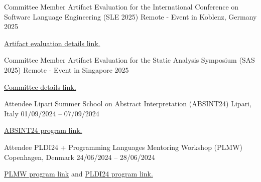 
\begin{cventries}

    \cventry
        {Committee Member} %
        {Artifact Evaluation for the International Conference on Software Language Engineering (SLE 2025)} %
        {Remote - Event in Koblenz, Germany} %
        {2025} %
        {
        \begin{cvitems} %
            \item {\href{https://www.sleconf.org/2025/ArtifactEvaluation.html}{Artifact evaluation details link.}}
        \end{cvitems}
        }

    \cventry
        {Committee Member} %
        {Artifact Evaluation for the Static Analysis Symposium (SAS 2025)} %
        {Remote - Event in Singapore} %
        {2025} %
        {
        \begin{cvitems} %
            \item {\href{https://2025.splashcon.org/committee/sas-2025-sas-artifact-sas-artifact-evaluation-committee}{Committee details link.}}
        \end{cvitems}
        }

    \cventry
        {Attendee} %
        {Lipari Summer School on Abstract Interpretation (ABSINT24)} %
        {Lipari, Italy} %
        {01/09/2024 – 07/09/2024} %
        {
        \begin{cvitems} %
            \item {\href{https://drive.google.com/file/d/1uhLXjf0C\_OeptfQwxXwk\_3T8aFOkDMYC/view?pli=1}{ABSINT24 program link.}}
        \end{cvitems}
        }

    \cventry
        {Attendee} %
        {PLDI24 + Programming Languages Mentoring Workshop (PLMW)} %
        {Copenhagen, Denmark} %
        {24/06/2024 – 28/06/2024} %
        {
        \begin{cvitems} %
            \item {\href{https://pldi24.sigplan.org/track/PLMW-PLDI-2024\#program}{PLMW program link}
            and \href{https://pldi24.sigplan.org/program/program-pldi-2024/}{PLDI24 program link.}}
        \end{cvitems}
        }


\end{cventries}
